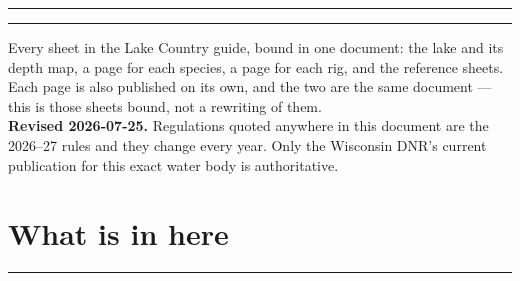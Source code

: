 

\newcommand{\CompendiumBuildRoot}{../../../../build/lake-country-fishing}





\thispagestyle{empty}
\null\vspace{0.14\textheight}
\noindent\rule{\linewidth}{2.4pt}\par
\vspace{0.7em}
\par
\vspace{0.4em}
\par
\vspace{0.5em}
\noindent\rule{\linewidth}{0.5pt}\par
\vspace{1.4em}
\noindent\begin{minipage}{0.86\linewidth}
Every sheet in the Lake Country guide, bound in one document: the lake and its
depth map, a page for each species, a page for each rig, and the reference
sheets. Each page is also published on its own, and the two are the same
document --- this is those sheets bound, not a rewriting of them.\\[0.8em]
\textbf{Revised 2026-07-25.} Regulations quoted anywhere in this document are
the 2026--27 rules and they change every year. Only the Wisconsin DNR's current
publication for this exact water body is authoritative.
\end{minipage}\par
\vfill
{}\par
\clearpage

\thispagestyle{telosfirst}
\section*{What is in here}
\vspace{-0.4em}\rule{\linewidth}{0.4pt}\vspace{0.4em}

